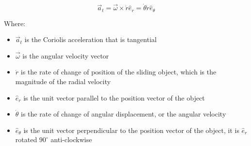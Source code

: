\documentclass[11pt]{article}
\begin{document}
\[\vec{a}_t = \vec{\omega} \times \dot{r} \hat{e}_r = \dot{\theta} \dot{r} \hat{e}_{\theta}\]

Where:
\begin{itemize}
\item \(\vec{a}_t\) is the Coriolis acceleration that is tangential
\item \(\vec{\omega}\) is the angular velocity vector
\item \(\dot{r}\) is the rate of change of position of the sliding object, which is the magnitude of the radial velocity
\item \(\hat{e}_r\) is the unit vector parallel to the position vector of the object
\item \(\dot{\theta}\) is the rate of change of angular displacement, or the angular velocity
\item \(\hat{e}_{\theta}\) is the unit vector perpendicular to the position vector of the object, it is \(\hat{e}_r\) rotated \(90^{\circ}\) anti-clockwise
\end{itemize}
\end{document}
